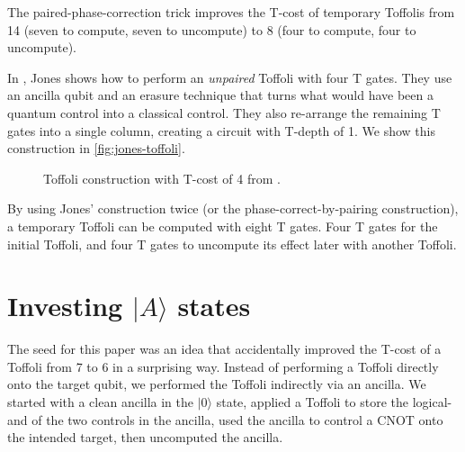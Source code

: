 \documentclass[twocolumn,longbibliography]{quantumarticle-customized}
\newcommand{\qH}{\gate{H}}
\newcommand{\qT}{\gate{T}}
\newcommand{\qTi}{\gate{T^\dagger}}
\newcommand{\qSi}{\gate{S^\dagger}}
\newcommand{\qO}{\lstick{|0\rangle}}
\begin{document}
The paired-phase-correction trick improves the T-cost of temporary Toffolis from 14 (seven to compute, seven to uncompute) to 8 (four to compute, four to uncompute).

In \cite{Jones2013}, Jones shows how to perform an {\em unpaired} Toffoli with four T gates.
They use an ancilla qubit and an erasure technique that turns what would have been a quantum control into a classical control.
They also re-arrange the remaining T gates into a single column, creating a circuit with T-depth of 1.
We show this construction in \autoref{fig:jones-toffoli}.

\begin{figure}
  \resizebox{\linewidth}{!}{
    \Qcircuit @R=1.5em @C=0.7em {
      &\ctrl{1} &\qw & &   & & &     &\qw &\qw &\qw      &\qw  &\ctrl{3} &\qw &\qw      &\qw  &\qw &\qw  &\qw       &\qw &\qw    &\ctrl{1}       &\qw \\
      &\ctrl{1} &\qw & & = & & &     &\qw &\qw &\ctrl{2} &\qw  &\qw      &\qw &\ctrl{2} &\qw  &\qw &\qw  &\qw       &\qw &\qw    &\gate{Z}       &\qw \\
      &\targ    &\qw & &   & & &     &\qw &\qw &\qw      &\qw  &\qw      &\qw &\qw      &\qw  &\qw &\qw  &\targ     &\qw &\qw    &\qw\cwx        &\qw \\
      &         &    & &   & & & \qO &\qH &\qT &\targ    &\qTi &\targ    &\qT &\targ    &\qTi &\qH &\qSi &\ctrl{-1} &\qH &\meter &\cw\cwx\bullet & \\
    }
  }
  \caption{
	Toffoli construction with T-cost of 4 from \cite{Jones2013}.
  }
  \label{fig:jones-toffoli}
\end{figure}

By using Jones' construction twice (or the phase-correct-by-pairing construction), a temporary Toffoli can be computed with eight T gates.
Four T gates for the initial Toffoli, and four T gates to uncompute its effect later with another Toffoli.


\section{Investing $|A\rangle$ states}
\label{sec:invest}

The seed for this paper was an idea that accidentally improved the T-cost of a Toffoli from 7 to 6 in a surprising way.
Instead of performing a Toffoli directly onto the target qubit, we performed the Toffoli indirectly via an ancilla.
We started with a clean ancilla in the $|0\rangle$ state, applied a Toffoli to store the logical-and of the two controls in the ancilla, used the ancilla to control a CNOT onto the intended target, then uncomputed the ancilla.
\end{document}
